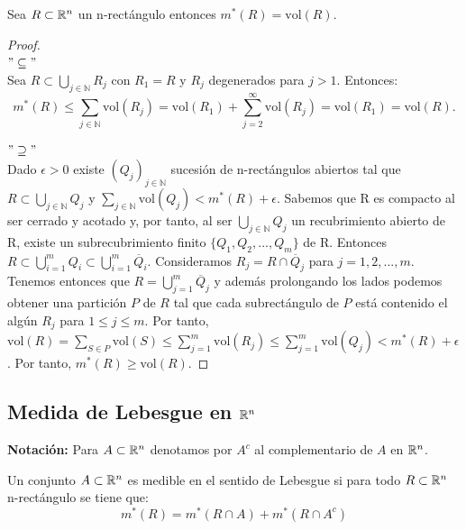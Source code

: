 \begin{proposición}
Sea $R \subset \mathbb{R}^n$ un n-rectángulo entonces $m^*(R) = \text{vol}(R)$.
\end{proposición}

\begin{proof}
    \leavevmode\\
    $"\subseteq "$\\
    Sea \( R \subset \bigcup_{j \in \mathbb{N}} R_j \) con \( R_1 = R \) y \( R_j \) degenerados para \( j > 1 \). Entonces:
    \[
        m^*(R) \leq \sum_{j \in \mathbb{N}} \text{vol}(R_j) = \text{vol}(R_1) + \sum_{j=2}^{\infty} \text{vol}(R_j) = \text{vol}(R_1) = \text{vol}(R).
    \]

    $"\supseteq"$\\
    Dado $\epsilon > 0$ existe $(Q_j)_{j \in \mathbb{N}}$ sucesión de n-rectángulos abiertos tal que $R \subset \bigcup_{j \in \mathbb{N}} Q_j$ y $\sum_{j \in \mathbb{N}} \text{vol}(Q_j) < m^*(R) + \epsilon$. Sabemos que R es compacto al ser cerrado y acotado y, por tanto, al ser $\bigcup_{j \in \mathbb{N}} Q_j$ un recubrimiento abierto de R, existe un subrecubrimiento finito $\{Q_1, Q_2, ..., Q_m\}$ de R. Entonces $R \subset \bigcup_{i=1}^m Q_i \subset \bigcup_{i = 1}^m \overline{Q}_i$. Consideramos $R_j = R \cap \overline{Q}_j$ para $j = 1, 2, ..., m$. Tenemos entonces que $R = \bigcup_{j = 1}^{m} \overline{Q}_j$ y además prolongando los lados podemos obtener una partición $P$ de $R$ tal que cada subrectángulo de $P$ está contenido el algún $R_j$ para $1 \leq j \leq m$. Por tanto, $\text{vol}(R) = \sum_{S \in P} \text{vol}(S) \leq \sum_{j = 1}^{m} \text{vol}(R_j) \leq \sum_{j = 1}^{m} \text{vol}(Q_j) < m^*(R) + \epsilon$. Por tanto, $m^*(R) \geq \text{vol}(R)$.
\end{proof}

\subsection{Medida de Lebesgue en $\mathbb{R}^n$}

\textbf{Notación:} Para $A \subset \mathbb{R}^n$ denotamos por $A^c$ al complementario de $A$ en $\mathbb{R}^n$.

\begin{definición}
Un conjunto $A \subset \mathbb{R}^n$ es medible en el sentido de Lebesgue si para todo $R \subset \mathbb{R}^n$ n-rectángulo se tiene que:
\begin{equation}
    m^*(R) = m^*(R \cap A) + m^*(R \cap A^c)
\end{equation}
\end{definición}

